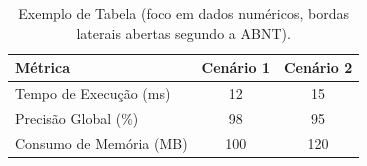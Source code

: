 \begin{table}[H]
  \centering
  \caption{Exemplo de Tabela (foco em dados numéricos, bordas laterais abertas segundo a ABNT).}
  \label{tab:exemplo_tabela}
  \begin{tabular}{lcc}
    \hline
    \textbf{Métrica} & \textbf{Cenário 1} & \textbf{Cenário 2} \\
    \hline
    Tempo de Execução (ms) & 12 & 15 \\
    Precisão Global (\%) & 98 & 95 \\
    Consumo de Memória (MB) & 100 & 120 \\
    \hline
  \end{tabular}
\end{table}
